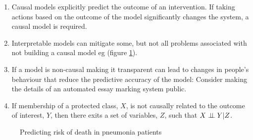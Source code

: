 \documentclass[a3,portrait,14pt]{sciposter}
\begin{document}
\begin{multicols}{2}
\begin{enumerate}
\item Causal models explicitly predict the outcome of an intervention. If taking actions based on the outcome of the model significantly changes the system, a causal model is required.
\item Interpretable models can mitigate some, but not all problems associated with not building a causal model eg \cite{Caruana2015} (figure \ref{fig:pneumonia}).
\item If a model is non-causal making it transparent can lead to changes in people's behaviour that reduce the predictive accuracy of the model: Consider making the details of an automated essay marking system public. 
\item If membership of a protected class, $X$, is not causally related to the outcome of interest, $Y$, then there exits a set of variables, $Z$, such that $X \perp\!\!\!\perp Y |Z$. 

\end{enumerate}

\begin{figure}[H]
	\caption{Predicting risk of death in pneumonia patients}
	\label{fig:pneumonia}
	\centering    
\end{figure}




\end{multicols}
\end{document}
